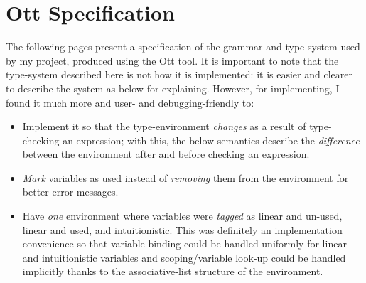 \chapter{Ott Specification}\label{chap:ott_spec}

The following pages present a specification of the grammar and type-system used
by my project, produced using the Ott\cite{sewell_ott} tool. It is important to note
that the type-system described here is not how it is implemented: it is easier
and clearer to describe the system as below for explaining. However, for implementing,
I found it much more and user- and debugging-friendly to:

\begin{itemize}

    \item Implement it so that the type-environment \emph{changes} as a result
        of type-checking an expression; with this, the below semantics describe
        the \emph{difference} between the environment after and before checking
        an expression.

    \item \emph{Mark} variables as used instead of \emph{removing} them from the
        environment for better error messages.

    \item Have \emph{one} environment where variables were \emph{tagged} as
        linear and un-used, linear and used, and intuitionistic. This was
        definitely an implementation convenience so that variable binding could
        be handled uniformly for linear and intuitionistic variables and
        scoping/variable look-up could be handled implicitly thanks to the
        associative-list structure of the environment.

\end{itemize}

\clearpage%
\ottall%
